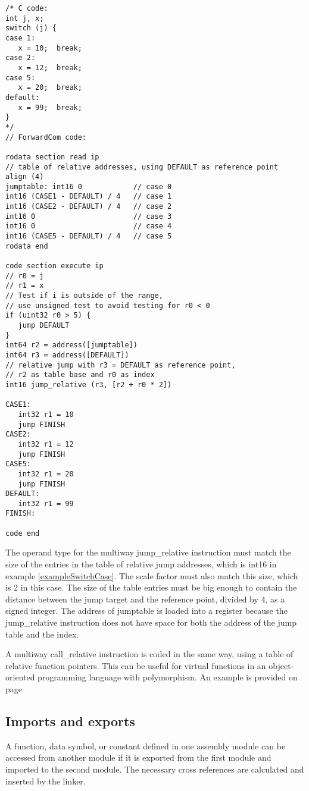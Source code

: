 \documentclass[forwardcom.tex]{subfiles}
\begin{document}
\begin{example}
\label{exampleSwitchCase}
\end{example}
\begin{lstlisting}[frame=single]
/* C code:
int j, x;
switch (j) {
case 1:
   x = 10;  break;
case 2:
   x = 12;  break;
case 5:   
   x = 20;  break;
default:
   x = 99;  break;
}
*/
// ForwardCom code:

rodata section read ip
// table of relative addresses, using DEFAULT as reference point
align (4)
jumptable: int16 0            // case 0
int16 (CASE1 - DEFAULT) / 4   // case 1
int16 (CASE2 - DEFAULT) / 4   // case 2
int16 0                       // case 3
int16 0                       // case 4
int16 (CASE5 - DEFAULT) / 4   // case 5
rodata end

code section execute ip
// r0 = j
// r1 = x
// Test if i is outside of the range,
// use unsigned test to avoid testing for r0 < 0
if (uint32 r0 > 5) {
   jump DEFAULT
}
int64 r2 = address([jumptable])
int64 r3 = address([DEFAULT])
// relative jump with r3 = DEFAULT as reference point,
// r2 as table base and r0 as index
int16 jump_relative (r3, [r2 + r0 * 2])

CASE1:
   int32 r1 = 10
   jump FINISH
CASE2:
   int32 r1 = 12
   jump FINISH
CASE5:
   int32 r1 = 20
   jump FINISH
DEFAULT:
   int32 r1 = 99
FINISH:

code end
\end{lstlisting}
\vv

The operand type for the multiway jump\_relative instruction must match the size of the entries in the table of relative jump addresses, which is int16 in example \ref{exampleSwitchCase}. The scale factor must also match this size, which is 2 in this case. The size of the table entries must be big enough to contain the distance between the jump target and the reference point, divided by 4, as a signed integer. 
The address of jumptable is loaded into a register because the jump\_relative instruction does not have space for both the address of the jump table and the index.
\vspace{4mm}

A multiway call\_relative instruction is coded in the same way, using a table of relative function pointers. This can be useful for virtual functions in an object-oriented programming language with polymorphism. An example is provided on page \pageref{exampleVirtualFunctions}
\vspace{4mm}


\subsection{Imports and exports} \label{assemblyImportExport}
A function, data symbol, or constant defined in one assembly module can be accessed from another module if it is exported from the first module and imported to the second module. The necessary cross references are calculated and inserted by the linker.
\vv
\end{document}
